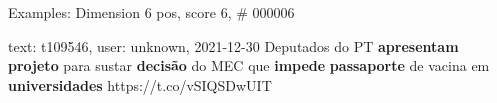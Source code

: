 \begin{frame}{Examples: Dimension 6 pos, score 6, \# 000006}
\footnotesize
\begin{exampleblock}{text: t109546, user: unknown, 2021-12-30}
Deputados do PT \textbf{apresentam} \textbf{projeto} para sustar 
\textbf{decisão} do MEC que \textbf{impede} \textbf{passaporte} de vacina em 
\textbf{universidades} https://t.co/vSIQSDwUIT 
\end{exampleblock}
\end{frame}
